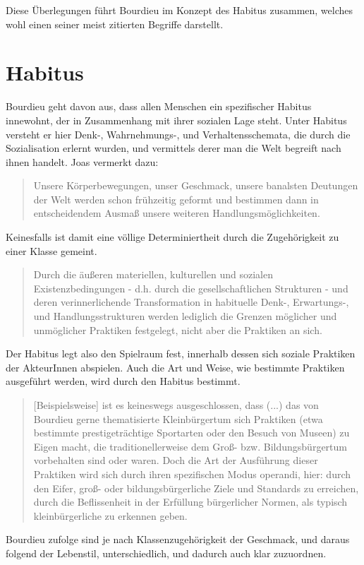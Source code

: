 \documentclass[a4paper, german, oneside]{scrbook}
\begin{document}
Diese Überlegungen führt Bourdieu im Konzept des Habitus zusammen, welches wohl einen seiner meist zitierten Begriffe darstellt.


\section{Habitus}
\label{habitus}
Bourdieu geht davon aus, dass allen Menschen ein spezifischer Habitus innewohnt, der in Zusammenhang mit ihrer sozialen Lage steht. Unter Habitus versteht er hier Denk-, Wahrnehmungs-, und Verhaltensschemata, die durch die Sozialisation erlernt wurden, und vermittels derer man die Welt begreift nach ihnen handelt. Joas vermerkt dazu: \blockquote[{\cite[533]{joas_sozialtheorie:_2004}}]{Unsere Körperbewegungen, unser Geschmack, unsere banalsten Deutungen der Welt werden schon frühzeitig geformt und bestimmen dann in entscheidendem Ausmaß unsere weiteren Handlungsmöglichkeiten.} Keinesfalls ist damit eine völlige Determiniertheit durch die Zugehörigkeit zu einer Klasse gemeint. \blockquote[{\cite[69]{schwingel_pierre_2009}}]{Durch die äußeren materiellen, kulturellen und sozialen Existenzbedingungen - d.h. durch die gesellschaftlichen Strukturen - und deren verinnerlichende Transformation in habituelle Denk-, Erwartungs-, und Handlungsstrukturen werden lediglich die Grenzen möglicher und unmöglicher Praktiken festgelegt, nicht aber die Praktiken an sich.}

Der Habitus legt also den Spielraum fest, innerhalb dessen sich soziale Praktiken der AkteurInnen abspielen. Auch die Art und Weise, wie bestimmte Praktiken ausgeführt werden, wird durch den Habitus bestimmt.

\blockquote[{\cite[71]{schwingel_pierre_2009}}]{[Beispielsweise] ist es keineswegs ausgeschlossen, dass (...) das von Bourdieu gerne thematisierte Kleinbürgertum sich Praktiken (etwa bestimmte prestigeträchtige Sportarten oder den Besuch von Museen) zu Eigen macht, die traditionellerweise dem Groß- bzw. Bildungsbürgertum vorbehalten sind oder waren. Doch die Art der Ausführung dieser Praktiken wird sich durch ihren spezifischen Modus operandi, hier: durch den Eifer, groß- oder bildungsbürgerliche Ziele und Standards zu erreichen, durch die Beflissenheit in der Erfüllung bürgerlicher Normen, als typisch kleinbürgerliche zu erkennen geben.}

Bourdieu zufolge sind je nach Klassenzugehörigkeit der Geschmack, und daraus folgend der Lebenstil, unterschiedlich, und dadurch auch klar zuzuordnen. 
\end{document}
